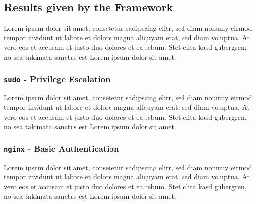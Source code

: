 \subsection{Results given by the Framework}

Lorem ipsum dolor sit amet, consetetur sadipscing elitr, sed diam nonumy eirmod
tempor invidunt ut labore et dolore magna aliquyam erat, sed diam voluptua. At
vero eos et accusam et justo duo dolores et ea rebum. Stet clita kasd gubergren,
no sea takimata sanctus est Lorem ipsum dolor sit amet.

\subsubsection{\texttt{sudo} - Privilege Escalation}

Lorem ipsum dolor sit amet, consetetur sadipscing elitr, sed diam nonumy eirmod
tempor invidunt ut labore et dolore magna aliquyam erat, sed diam voluptua. At
vero eos et accusam et justo duo dolores et ea rebum. Stet clita kasd gubergren,
no sea takimata sanctus est Lorem ipsum dolor sit amet.

\subsubsection{\texttt{nginx} - Basic Authentication}

Lorem ipsum dolor sit amet, consetetur sadipscing elitr, sed diam nonumy eirmod
tempor invidunt ut labore et dolore magna aliquyam erat, sed diam voluptua. At
vero eos et accusam et justo duo dolores et ea rebum. Stet clita kasd gubergren,
no sea takimata sanctus est Lorem ipsum dolor sit amet.

